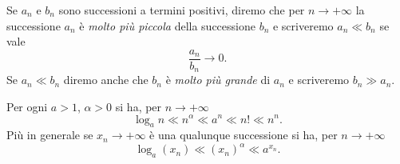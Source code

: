 \begin{definition}
\mymark{***}
Se $a_n$ e $b_n$ sono successioni a termini positivi, diremo che
per $n\to +\infty$ la successione $a_n$ è \emph{molto più piccola}
della successione $b_n$ e scriveremo $a_n \ll b_n$ se vale
\mymargin{$\ll$}
\[
\frac{a_n}{b_n} \to 0.
\]
Se $a_n \ll b_n$ diremo anche che $b_n$ è \emph{molto più grande}
di $a_n$ e scriveremo $b_n \gg a_n$.
\mymargin{$\gg$}
\end{definition}

\begin{theorem}
\mymark{***}
Per ogni $a>1$, $\alpha>0$ si ha, per $n\to +\infty$
\[
\log_a n \ll n^\alpha \ll a^n \ll n! \ll n^n.
\]
Più in generale se $x_n \to +\infty$
è una qualunque successione si ha,
per $n\to+\infty$
\[
\log_a(x_n) \ll (x_n)^\alpha \ll a^{x_n}.
\]
\end{theorem}
%
